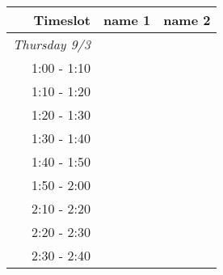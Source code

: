 \documentclass{article}
\begin{document}
\bgroup
\def\arraystretch{1.7}
\begin{tabular}{ r | c | c }
  \textbf{Timeslot} & \textbf{name 1} & \textbf{name 2} \\ \hline \hline
  \emph{Thursday 9/3} & \hspace{40mm} & \hspace{40mm} \\
  1:00 - 1:10 & & \\ \hline
  1:10 - 1:20 & & \\ \hline
  1:20 - 1:30 & & \\ \hline
  1:30 - 1:40 & & \\ \hline
  1:40 - 1:50 & & \\ \hline
  1:50 - 2:00 & & \\ \hline
  2:10 - 2:20 & & \\ \hline
  2:20 - 2:30 & & \\ \hline
  2:30 - 2:40 & & \\ \hline
  \end{tabular}
\egroup
\end{document}

